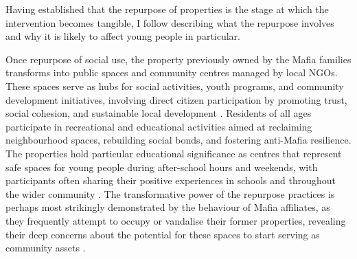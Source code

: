 \documentclass[12pt]{article}
\theoremstyle{plain}
\theoremstyle{plain}
\theoremstyle{plain}
\theoremstyle{definition}
\theoremstyle{plain}
\theoremstyle{definition}
\theoremstyle{plain}
\theoremstyle{remark}
\theoremstyle{definition}
\theoremstyle{definition}
\theoremstyle{plain}
\begin{document}
 Having established that the repurpose of properties is the stage at which the intervention becomes tangible, I follow describing what the repurpose involves and why it is likely to affect young people in particular.\par
 Once repurpose of social use, the property previously owned by the Mafia families transforms into public spaces and community centres managed by local NGOs. These spaces serve as hubs for social activities, youth programs, and community development initiatives, involving direct citizen participation by promoting trust, social cohesion, and sustainable local development \citep{nazzaro_il_2021, falcone_beneitalia_2016}. Residents of all ages participate in recreational and educational activities aimed at reclaiming neighbourhood spaces, rebuilding social bonds, and fostering anti-Mafia resilience. The properties hold particular educational significance as centres that represent safe spaces for young people during after-school hours and weekends, with participants often sharing their positive experiences in schools and throughout the wider community \citep{nazzaro_il_2021}. The transformative power of the repurpose practices is perhaps most strikingly demonstrated by the behaviour of Mafia affiliates, as they frequently attempt to occupy or vandalise their former properties, revealing their deep concerns about the potential for these spaces to start serving as community assets \citep{italian_ministry_of_justice_carta_2018}.


\FloatBarrier
\vspace{0.6cm}
\end{document}
